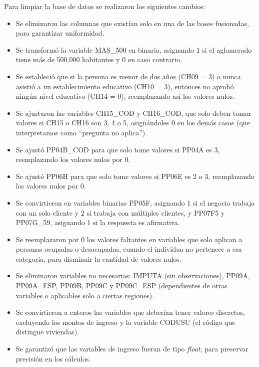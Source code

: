 \documentclass[11pt,a4paper]{article}
\begin{document}
Para limpiar la base de datos se realizaron los siguientes cambios:

\begin{itemize}
  \item Se eliminaron las columnas que existían solo en una de las bases fusionadas, para
        garantizar uniformidad.
  \item Se transformó la variable MAS\_500 en binaria, asignando 1 si el aglomerado tiene
        más de 500.000 habitantes y 0 en caso contrario.
  \item Se estableció que si la persona es menor de dos años (CH09 = 3) o nunca asistió a un
        establecimiento educativo (CH10 = 3), entonces no aprobó ningún nivel educativo
        (CH14 = 0), reemplazando así los valores nulos.
  \item Se ajustaron las variables CH15\_COD y CH16\_COD, que solo deben tomar valores si
        CH15 o CH16 son 3, 4 o 5, asignándoles 0 en los demás casos (que interpretamos como
        ``pregunta no aplica'').
  \item Se ajustó PP04B\_COD para que solo tome valores si PP04A es 3, reemplazando los
        valores nulos por 0.
  \item Se ajustó PP06H para que solo tome valores si PP06E es 2 o 3, reemplazando los
        valores nulos por 0.
  \item Se convirtieron en variables binarias PP05F, asignando 1 si el negocio trabaja con
        un solo cliente y 2 si trabaja con múltiples clientes, y PP07F5 y PP07G\_59,
        asignando 1 si la respuesta es afirmativa.
  \item Se reemplazaron por 0 los valores faltantes en variables que solo aplican a personas
        ocupadas o desocupadas, cuando el individuo no pertenece a esa categoría, para
        disminuir la cantidad de valores nulos.
  \item Se eliminaron variables no necesarias: IMPUTA (sin observaciones), PP09A,
        PP09A\_ESP, PP09B, PP09C y PP09C\_ESP (dependientes de otras variables o aplicables
        solo a ciertas regiones).
  \item Se convirtieron a enteros las variables que deberían tener valores discretos,
        excluyendo los montos de ingreso y la variable CODUSU (el código que distingue
        viviendas).
  \item Se garantizó que las variables de ingreso fueran de tipo \textit{float}, para
        preservar precisión en los cálculos.
\end{itemize}
\end{document}
